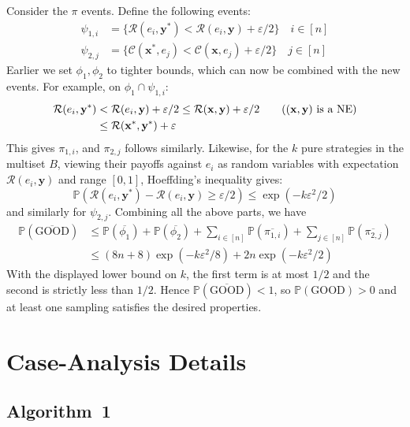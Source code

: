 Consider the $\pi$ events. Define the following events:
\begin{align*}
  \psi_{1, i} & = \{ \mathcal{R}(e_i, \mathbf{y}^*) < \mathcal{R}(e_i, \mathbf{y}) + \varepsilon / 2 \} \quad i \in [n] \\
  \psi_{2, j} & = \{ \mathcal{C}(\mathbf{x}^*, e_j) < \mathcal{C}(\mathbf{x}, e_j) + \varepsilon / 2 \} \quad j \in [n]
\end{align*}
Earlier we set $\phi_1, \phi_2$ to tighter bounds, which can now be combined with the new events. For example, on $\phi_1 \cap \psi_{1, i}$:
\begin{align*}
  \mathcal{R}(e_i, \mathbf{y}^*) & < \mathcal{R}(e_i, \mathbf{y}) + \varepsilon / 2 \le \mathcal{R}(\mathbf{x}, \mathbf{y}) + \varepsilon / 2 \tag{$(\mathbf{x}, \mathbf{y})$ is a NE} \\
                                 & \le \mathcal{R}(\mathbf{x}^*, \mathbf{y}^*) + \varepsilon
\end{align*}
This gives $\pi_{1, i}$, and $\pi_{2, j}$ follows similarly. Likewise, for the $k$ pure strategies in the multiset $B$, viewing their payoffs against $e_i$ as random variables with expectation $\mathcal{R}(e_i, \mathbf{y})$ and range $[0, 1]$, Hoeffding's inequality gives:
\[
  \mathbb{P}(\mathcal{R}(e_i, \mathbf{y}^*) - \mathcal{R}(e_i, \mathbf{y}) \ge \varepsilon / 2) \le \exp(-k\varepsilon^2 / 2)
\]
and similarly for $\psi_{2, j}$. Combining all the above parts, we have
\begin{align*}
  \mathbb{P}(\overline{\text{GOOD}}) & \le \mathbb{P}(\overline{\phi_1}) + \mathbb{P}(\overline{\phi_2}) + \sum_{i \in [n]} \mathbb{P}(\overline{\pi_{1, i}}) + \sum_{j \in [n]} \mathbb{P}(\overline{\pi_{2, j}}) \\
                                     & \le (8n + 8) \exp(-k\varepsilon^2 / 8) + 2n \exp(-k\varepsilon^2 / 2)
\end{align*}
With the displayed lower bound on $k$, the first term is at most $1/2$ and the second is strictly less than $1/2$. Hence $\mathbb{P}(\overline{\text{GOOD}}) < 1$, so $\mathbb{P}(\text{GOOD}) > 0$ and at least one sampling satisfies the desired properties.

\section{Case-Analysis Details}
\label{app:case-analysis-details}

\subsection{Algorithm~1}
\label{app:case-analysis-details-algo-1}

